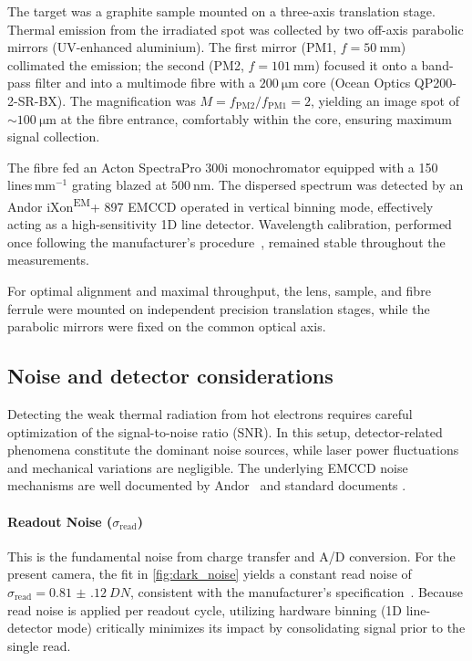 \documentclass[
	a4paper,
]{scrarticle}
\begin{document}
The target was a graphite sample mounted on a three-axis translation stage. Thermal emission from the irradiated spot was collected by two off-axis parabolic mirrors (UV-enhanced aluminium). The first mirror (PM1, \(f=\SI{50}{\milli\metre}\)) collimated the emission; the second (PM2, \(f=\SI{101}{\milli\metre}\)) focused it onto a band-pass filter and into a multimode fibre with a $\SI{200}{\micro\metre}$ core (Ocean Optics QP200-2-SR-BX). The magnification was \(M = f_{\mathrm{PM2}}/f_{\mathrm{PM1}} = 2\), yielding an image spot of \(\sim\SI{100}{\micro\metre}\) at the fibre entrance, comfortably within the core, ensuring maximum signal collection.

The fibre fed an Acton SpectraPro 300i monochromator equipped with a 150\,lines\,mm\(^{-1}\) grating blazed at $\SI{500}{\nano\metre}$. The dispersed spectrum was detected by an Andor iXon\textsuperscript{EM}+ 897 EMCCD operated in vertical binning mode, effectively acting as a high-sensitivity 1D line detector. Wavelength calibration, performed once following the manufacturer’s procedure~\cite{roobThermalRadiationUltrafast2025}, remained stable throughout the measurements.

For optimal alignment and maximal throughput, the lens, sample, and fibre ferrule were mounted on independent precision translation stages, while the parabolic mirrors were fixed on the common optical axis.

\subsection{Noise and detector considerations}
Detecting the weak thermal radiation from hot electrons requires careful optimization of the signal-to-noise ratio (SNR). In this setup, detector-related phenomena constitute the dominant noise sources, while laser power fluctuations and mechanical variations are negligible. The underlying EMCCD noise mechanisms are well documented by Andor~\cite{dr.jowaltersSensitivityNoiseCCD2023,andorEstablishingSensitivityScientifica} and standard documents \cite{europeanmachinevisionassociationStandardCharacterizationImage2010}.

\paragraph{Readout Noise ($\sigma_{\text{read}}$)}
This is the fundamental noise from charge transfer and A/D conversion. For the present camera, the fit in \autoref{fig:dark_noise} yields a constant read noise of
\(\sigma_{\text{read}}=\SI{0.81(12)}{DN}\), consistent with the manufacturer’s specification~\cite{andorIXonEM897Manual}.
Because read noise is applied per readout cycle, utilizing hardware binning (1D line-detector mode) critically minimizes its impact by consolidating signal prior to the single read.
\end{document}
